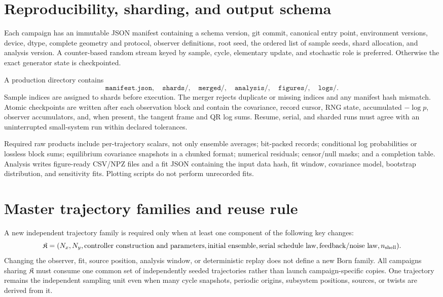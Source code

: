 \documentclass[aps,prx,onecolumn,nofootinbib,superscriptaddress,longbibliography]{revtex4-2}
\newcommand{\code}[1]{\texttt{#1}}
\begin{document}
\section{Reproducibility, sharding, and output schema}

Each campaign has an immutable JSON manifest containing a schema version, git commit,
canonical entry point, environment versions, device, dtype, complete geometry and protocol,
observer definitions, root seed, the ordered list of sample seeds, shard allocation, and
analysis version.  A counter-based random stream keyed by sample, cycle, elementary update,
and stochastic role is preferred.  Otherwise the exact generator state is checkpointed.

A production directory contains
\begin{equation}
 \code{manifest.json},\quad \code{shards/},\quad \code{merged/},\quad
 \code{analysis/},\quad \code{figures/},\quad \code{logs/}.
\end{equation}
Sample indices are assigned to shards before execution.  The merger rejects duplicate or
missing indices and any manifest hash mismatch.  Atomic checkpoints are written after each
observation block and contain the covariance, record cursor, RNG state, accumulated
$-\log p$, observer accumulators, and, when present, the tangent frame and QR log sums.
Resume, serial, and sharded runs must agree with an uninterrupted small-system run within
declared tolerances.

Required raw products include per-trajectory scalars, not only ensemble averages; bit-packed
records; conditional log probabilities or lossless block sums; equilibrium covariance
snapshots in a chunked format; numerical residuals; censor/null masks; and a completion
table.  Analysis writes figure-ready CSV/NPZ files and a fit JSON containing the input data
hash, fit window, covariance model, bootstrap distribution, and sensitivity fits.  Plotting
scripts do not perform unrecorded fits.

\section{Master trajectory families and reuse rule}

A new independent trajectory family is required only when at least one component of the
following key changes:
\begin{equation}
 \mathfrak K=(N_x,N_y,\text{controller construction and parameters},
 \text{initial ensemble},\text{serial schedule law},
 \text{feedback/noise law},n_{\rm shell}).
 \label{eq:trajectory-family-key}
\end{equation}
Changing the observer, fit, source position, analysis window, or deterministic replay does
not define a new Born family.  All campaigns sharing $\mathfrak K$ must consume one common
set of independently seeded trajectories rather than launch campaign-specific copies.
One trajectory remains the independent sampling unit even when many cycle snapshots,
periodic origins, subsystem positions, sources, or twists are derived from it.
\end{document}
